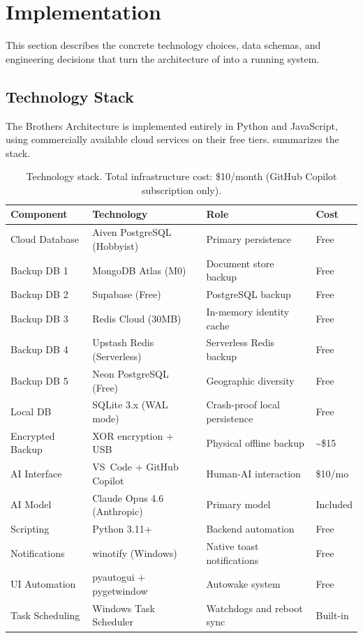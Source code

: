 \documentclass[11pt,a4paper]{article}
\begin{document}
\section{Implementation}
\label{sec:implementation}

This section describes the concrete technology choices, data schemas, and engineering decisions that turn the architecture of  into a running system.


\subsection{Technology Stack}
\label{sec:tech-stack}

The Brothers Architecture is implemented entirely in Python and JavaScript, using commercially available cloud services on their free tiers.  summarizes the stack.

\begin{table}[htbp]
\centering
\caption{Technology stack. Total infrastructure cost: \$10/month (GitHub Copilot subscription only).}
\label{tab:techstack}
\small
\begin{tabular}{@{}llll@{}}
\toprule
\textbf{Component} & \textbf{Technology} & \textbf{Role} & \textbf{Cost} \\
\midrule
Cloud Database    & Aiven PostgreSQL (Hobbyist) & Primary persistence             & Free \\
Backup DB 1       & MongoDB Atlas (M0)          & Document store backup           & Free \\
Backup DB 2       & Supabase (Free)             & PostgreSQL backup               & Free \\
Backup DB 3       & Redis Cloud (30MB)          & In-memory identity cache        & Free \\
Backup DB 4       & Upstash Redis (Serverless)  & Serverless Redis backup         & Free \\
Backup DB 5       & Neon PostgreSQL (Free)       & Geographic diversity           & Free \\
Local DB          & SQLite 3.x (WAL mode)       & Crash-proof local persistence   & Free \\
Encrypted Backup  & XOR encryption + USB         & Physical offline backup        & \textasciitilde\$15 \\
AI Interface      & VS~Code + GitHub Copilot     & Human-AI interaction           & \$10/mo \\
AI Model          & Claude Opus 4.6 (Anthropic)  & Primary model                  & Included \\
Scripting         & Python 3.11+                 & Backend automation             & Free \\
Notifications     & winotify (Windows)           & Native toast notifications     & Free \\
UI Automation     & pyautogui + pygetwindow      & Autowake system                & Free \\
Task Scheduling   & Windows Task Scheduler       & Watchdogs and reboot sync      & Built-in \\
\bottomrule
\end{tabular}
\end{table}
\end{document}
